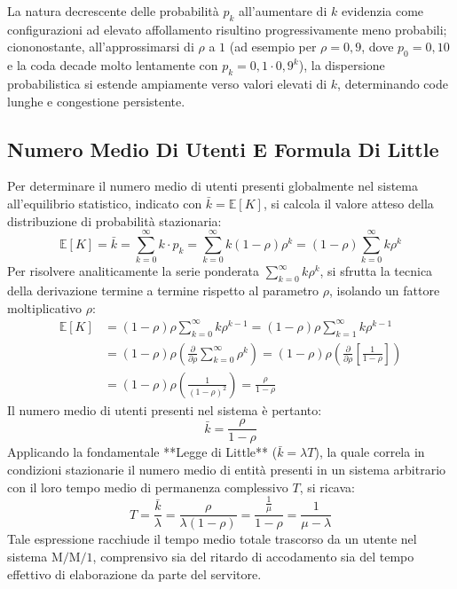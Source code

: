 \documentclass[11pt, a4paper]{article}
\begin{document}

La natura decrescente delle probabilità $p_k$ all'aumentare di $k$ evidenzia come configurazioni ad elevato affollamento risultino progressivamente meno probabili; ciononostante, all'approssimarsi di $\rho$ a $1$ (ad esempio per $\rho = 0{,}9$, dove $p_0 = 0{,}10$ e la coda decade molto lentamente con $p_k = 0{,}1 \cdot 0{,}9^k$), la dispersione probabilistica si estende ampiamente verso valori elevati di $k$, determinando code lunghe e congestione persistente.

\subsection{Numero Medio Di Utenti E Formula Di Little}

Per determinare il numero medio di utenti presenti globalmente nel sistema all'equilibrio statistico, indicato con $\bar{k} = \mathbb{E}[K]$, si calcola il valore atteso della distribuzione di probabilità stazionaria:
\[
\mathbb{E}[K] = \bar{k} = \sum_{k=0}^{\infty} k \cdot p_k = \sum_{k=0}^{\infty} k (1 - \rho)\rho^k = (1 - \rho)\sum_{k=0}^{\infty} k \rho^k
\]
Per risolvere analiticamente la serie ponderata $\sum_{k=0}^{\infty} k \rho^k$, si sfrutta la tecnica della derivazione termine a termine rispetto al parametro $\rho$, isolando un fattore moltiplicativo $\rho$:
\begin{align*}
\mathbb{E}[K] &= (1 - \rho)\rho \sum_{k=0}^{\infty} k \rho^{k-1} = (1 - \rho)\rho \sum_{k=1}^{\infty} k \rho^{k-1} \\
&= (1 - \rho)\rho \left( \frac{\partial}{\partial \rho} \sum_{k=0}^{\infty} \rho^k \right) = (1 - \rho)\rho \left( \frac{\partial}{\partial \rho} \left[ \frac{1}{1-\rho} \right] \right) \\
&= (1 - \rho)\rho \left( \frac{1}{(1-\rho)^2} \right) = \frac{\rho}{1 - \rho}
\end{align*}
Il numero medio di utenti presenti nel sistema è pertanto:
\[
\boxed{\bar{k} = \frac{\rho}{1 - \rho}}
\]
Applicando la fondamentale **Legge di Little** ($\bar{k} = \lambda T$), la quale correla in condizioni stazionarie il numero medio di entità presenti in un sistema arbitrario con il loro tempo medio di permanenza complessivo $T$, si ricava:
\[
\boxed{T = \frac{\bar{k}}{\lambda} = \frac{\rho}{\lambda (1 - \rho)} = \frac{\frac{1}{\mu}}{1 - \rho} = \frac{1}{\mu - \lambda}}
\]
Tale espressione racchiude il tempo medio totale trascorso da un utente nel sistema $\mathrm{M/M/1}$, comprensivo sia del ritardo di accodamento sia del tempo effettivo di elaborazione da parte del servitore.
\end{document}
